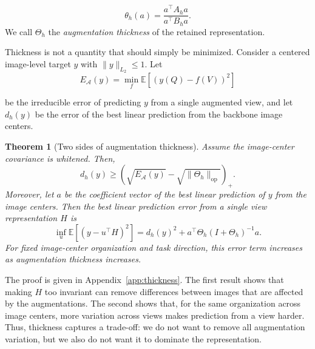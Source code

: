 \documentclass{article} %
\newtheorem{theorem}{Theorem}[section]
\theoremstyle{remark}
\begin{document}
\begin{equation}
    \theta_h(a)
    =
    \frac{a^\top A_h a}{a^\top B_h a}.
\end{equation}
We call $\Theta_h$ the \emph{augmentation thickness} of the retained representation.

Thickness is not a quantity that should simply be minimized. Consider a centered image-level target $y$ with $\|y\|_{L_2}\leq1$. Let
\begin{equation}
    E_{\mathcal A}(y)
    =
    \min_f
    \mathbb{E}\!\left[(y(Q)-f(V))^2\right]
\end{equation}

be the irreducible error of predicting $y$ from a single augmented view, and let $d_h(y)$ be the error of the best linear prediction from the backbone image centers.

\begin{theorem}[Two sides of augmentation thickness]
\label{thm:thickness}
Assume the image-center covariance is whitened. Then,
\begin{equation}
    d_h(y)
    \geq
    \left(
        \sqrt{E_{\mathcal A}(y)}
        -
        \sqrt{\|\Theta_h\|_{\mathrm{op}}}
    \right)_+ .
    \label{eq:too-thin}
\end{equation}
Moreover, let $a$ be the coefficient vector of the best linear prediction of $y$ from the image centers. Then the best linear prediction error from a single view representation $H$ is
\begin{equation}
    \inf_u
    \mathbb{E}\!\left[(y-u^\top H)^2\right]
    =
    d_h(y)^2
    +
    a^\top
    \Theta_h (I+\Theta_h)^{-1} a.
    \label{eq:too-thick}
\end{equation}
For fixed image-center organization and task direction, this error term increases as augmentation thickness increases.
\end{theorem}

The proof is given in Appendix~\ref{app:thickness}. The first result shows that making $H$ too invariant can remove differences between images that are affected by the augmentations. The second shows that, for the same organization across image centers, more variation across views makes prediction from a view harder. Thus, thickness captures a trade-off: we do not want to remove all augmentation variation, but we also do not want it to dominate the representation.
\end{document}
